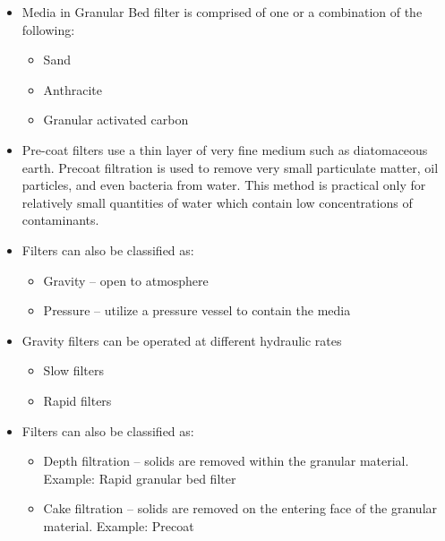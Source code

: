 \begin{itemize}
\item Media in Granular Bed filter is comprised of one or a combination of the following:
\begin{itemize}
\item Sand
\item Anthracite
\item Granular activated carbon
\end{itemize}
\item Pre-coat filters use a thin layer of very fine medium such as diatomaceous earth.  Precoat filtration is used to remove very small particulate matter, oil particles, and even bacteria from water. This method is practical only for relatively small quantities of water which contain low concentrations of contaminants.
\item Filters can also be classified as:
\begin{itemize}
\item Gravity – open to atmosphere
\item Pressure – utilize a pressure vessel to contain the media
\end{itemize}
\item Gravity filters can be operated at different hydraulic rates
\begin{itemize}
\item Slow filters
\item Rapid filters
\end{itemize}
\item Filters can also be classified as:
\begin{itemize}
\item Depth filtration – solids are removed within the granular material.  Example: Rapid granular bed filter
\item Cake filtration – solids are removed on the entering face of the granular material.  Example: Precoat
\end{itemize}


\end{itemize}
